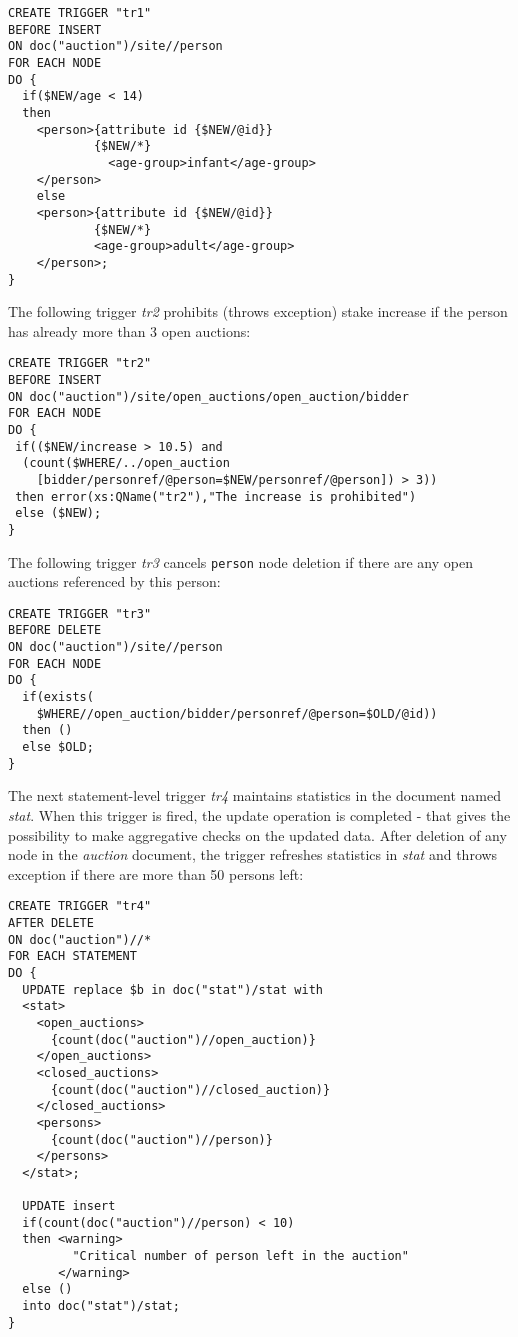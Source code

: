 \documentclass[a4paper,12pt]{article}
\begin{document}
\small{
\begin{verbatim}
CREATE TRIGGER "tr1"
BEFORE INSERT
ON doc("auction")/site//person
FOR EACH NODE
DO {
  if($NEW/age < 14)
  then
    <person>{attribute id {$NEW/@id}}
            {$NEW/*}
              <age-group>infant</age-group>
    </person>
    else
    <person>{attribute id {$NEW/@id}}
            {$NEW/*}
            <age-group>adult</age-group>
    </person>;
}
\end{verbatim}}

The following trigger \emph{tr2} prohibits (throws exception) stake increase if
the person has already more than 3 open auctions:

\small{
\begin{verbatim}
CREATE TRIGGER "tr2"
BEFORE INSERT
ON doc("auction")/site/open_auctions/open_auction/bidder
FOR EACH NODE
DO {
 if(($NEW/increase > 10.5) and
  (count($WHERE/../open_auction
    [bidder/personref/@person=$NEW/personref/@person]) > 3))
 then error(xs:QName("tr2"),"The increase is prohibited")
 else ($NEW);
}
\end{verbatim}}

The following trigger \emph{tr3} cancels \verb!person! node deletion if there
are any open auctions referenced by this person:

\small{
\begin{verbatim}
CREATE TRIGGER "tr3"
BEFORE DELETE
ON doc("auction")/site//person
FOR EACH NODE
DO {
  if(exists(
    $WHERE//open_auction/bidder/personref/@person=$OLD/@id))
  then ()
  else $OLD;
}
\end{verbatim}}

The next statement-level trigger \emph{tr4} maintains statistics in the document
named \emph{stat}. When this trigger is fired, the update operation is completed
- that gives the possibility to make aggregative checks on the updated data.
After deletion of any node in the \emph{auction} document, the trigger refreshes
statistics in \emph{stat} and throws exception if there are more than 50 persons
left:

\small{
\begin{verbatim}
CREATE TRIGGER "tr4"
AFTER DELETE
ON doc("auction")//*
FOR EACH STATEMENT
DO {
  UPDATE replace $b in doc("stat")/stat with
  <stat>
    <open_auctions>
      {count(doc("auction")//open_auction)}
    </open_auctions>
    <closed_auctions>
      {count(doc("auction")//closed_auction)}
    </closed_auctions>
    <persons>
      {count(doc("auction")//person)}
    </persons>
  </stat>;

  UPDATE insert
  if(count(doc("auction")//person) < 10)
  then <warning>
         "Critical number of person left in the auction"
       </warning>
  else ()
  into doc("stat")/stat;
}
\end{verbatim}}
\end{document}
